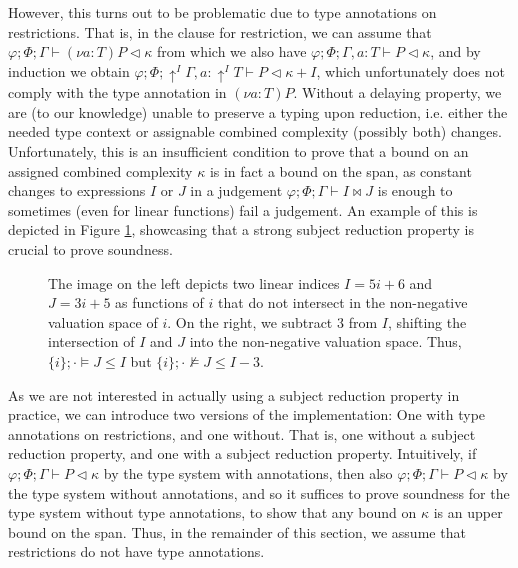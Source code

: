 %
However, this turns out to be problematic due to type annotations on restrictions. That is, in the clause for restriction, we can assume that $\varphi;\Phi;\Gamma\vdash (\nu a :T) P \triangleleft \kappa$ from which we also have $\varphi;\Phi;\Gamma,a:T\vdash P \triangleleft \kappa$, and by induction we obtain $\varphi;\Phi;\uparrow^I\!\!\Gamma,a:\uparrow^I\!\!T\vdash P \triangleleft \kappa + I$, which unfortunately does not comply with the type annotation in $(\nu a:T) P$. Without a delaying property, we are (to our knowledge) unable to preserve a typing upon reduction, i.e. either the needed type context or assignable combined complexity (possibly both) changes. Unfortunately, this is an insufficient condition to prove that a bound on an assigned combined complexity $\kappa$ is in fact a bound on the span, as constant changes to expressions $I$ or $J$ in a judgement $\varphi;\Phi;\Gamma\vdash I \bowtie J$ is enough to sometimes (even for linear functions) fail a judgement. An example of this is depicted in Figure \ref{fig:srnecess}, showcasing that a strong subject reduction property is crucial to prove soundness.\\ %

\begin{figure}
    \centering
    \caption{The image on the left depicts two linear indices $I = 5i+6$ and $J= 3i+5$ as functions of $i$ that do not intersect in the non-negative valuation space of $i$. On the right, we subtract $3$ from $I$, shifting the intersection of $I$ and $J$ into the non-negative valuation space. Thus, $\{i\};\cdot\vDash J \leq I$ but $\{i\};\cdot\nvDash J \leq I-3$. }
    \label{fig:srnecess}
\end{figure}
%

As we are not interested in actually using a subject reduction property in practice, we can introduce two versions of the implementation: One with type annotations on restrictions, and one without. That is, one without a subject reduction property, and one with a subject reduction property. Intuitively, if $\varphi;\Phi;\Gamma\vdash P \triangleleft \kappa$ by the type system with annotations, then also $\varphi;\Phi;\Gamma\vdash P \triangleleft \kappa$ by the type system without annotations, and so it suffices to prove soundness for the type system without type annotations, to show that any bound on $\kappa$ is an upper bound on the span. Thus, in the remainder of this section, we assume that restrictions do not have type annotations.

